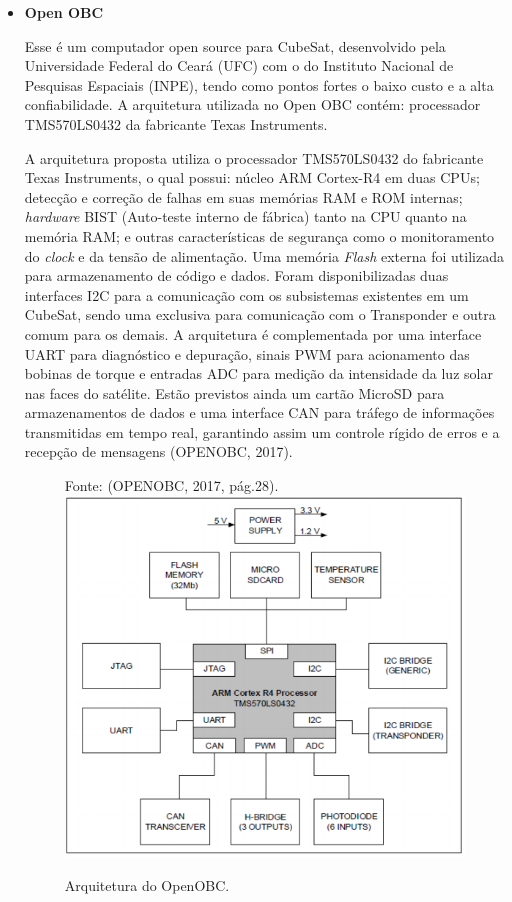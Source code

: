 \begin{itemize}
	\item \textbf{Open OBC}
	
	Esse é um computador open source para CubeSat, desenvolvido pela Universidade Federal do Ceará (UFC) com o do Instituto Nacional de Pesquisas Espaciais (INPE), tendo como pontos fortes o baixo custo e a alta confiabilidade. A arquitetura utilizada no Open OBC  contém: processador TMS570LS0432 da fabricante Texas Instruments.
	
	A arquitetura proposta utiliza o processador TMS570LS0432 do fabricante Texas Instruments, o qual possui: núcleo ARM Cortex-R4 em duas CPUs; detecção e correção de falhas em suas memórias RAM e ROM internas; \textit{hardware} BIST (Auto-teste interno de fábrica) tanto na CPU quanto na memória RAM; e outras características de segurança como o monitoramento do \textit{clock} e da tensão de alimentação. Uma memória \textit{Flash} externa foi utilizada para armazenamento de código e dados. Foram disponibilizadas duas interfaces I2C para a comunicação com os subsistemas existentes em um CubeSat, sendo uma exclusiva para comunicação com o Transponder e outra comum para os demais. A arquitetura é complementada por uma interface UART para diagnóstico e depuração, sinais PWM para acionamento das bobinas de torque e entradas ADC para medição da intensidade da luz solar nas faces do satélite. Estão previstos ainda um cartão MicroSD para armazenamentos de dados e uma interface CAN para tráfego de informações transmitidas em tempo real, garantindo assim um controle rígido de erros e a recepção de mensagens (OPENOBC, 2017).
	
	\begin{figure}[h]
		\centering
		
		Fonte: (OPENOBC, 2017, pág.28). \linebreak
		\includegraphics[keepaspectratio=true,scale=0.4]{figuras/openObc.PNG}
		\caption{Arquitetura do OpenOBC.}
		\label{fig13}
	\end{figure}
	\FloatBarrier
	

\end{itemize}

